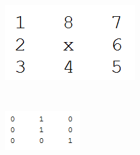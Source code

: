 \documentclass{article}
\begin{document}
\begin{figure}[H]
	\centering
	\begin{subfigure}[b]{0.3\textwidth}
		\includegraphics[width=\linewidth]{neighborhood}
		\caption{}
		\label{fig: example_neighborhood}
	\end{subfigure}
	\\
	\begin{subfigure}[b]{0.3\textwidth}
		\includegraphics[width=\linewidth]{example}
		\caption{}
		\label{fig: example_strand}
	\end{subfigure}
	\hspace{\fill}
	\begin{subfigure}[b]{0.1\textwidth}

\end{subfigure}
\end{figure}
\end{document}
